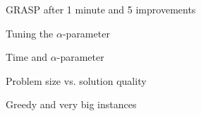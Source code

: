 \documentclass[presentation]{beamer}
\begin{document}
\begin{frame}{GRASP after 1 minute and 5 improvements}
\begin{figure}[H]
\centering

\end{figure}  
\end{frame}

\begin{frame}{Tuning the $\alpha$-parameter}
\begin{figure}[H]
\centering

\end{figure}  
\end{frame}

\begin{frame}{Time and $\alpha$-parameter}
\begin{figure}[H]
\centering

\end{figure}  
\end{frame}

% 

\begin{frame}{Problem size vs. solution quality}
\centering

\end{frame}

\begin{frame}{Greedy and very big instances}
\centering

\end{frame}
\end{document}
